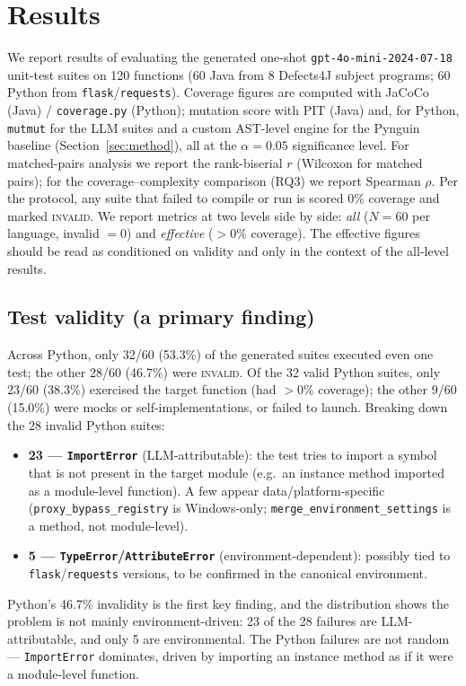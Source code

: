 \section{Results}
\label{sec:results}

We report results of evaluating the generated one-shot
\texttt{gpt-4o-mini-2024-07-18} unit-test suites on 120 functions (60 Java from 8
Defects4J subject programs; 60 Python from \texttt{flask}/\texttt{requests}). Coverage
figures are computed with JaCoCo (Java) / \texttt{coverage.py} (Python); mutation score
with PIT (Java) and, for Python, \texttt{mutmut} for the LLM suites and a custom AST-level
engine for the Pynguin baseline (Section~\ref{sec:method}), all at the $\alpha = 0.05$
significance level. For matched-pairs analysis we report the rank-biserial $r$ (Wilcoxon
for matched pairs); for the coverage--complexity comparison (RQ3) we report Spearman
$\rho$. Per the protocol, any suite that failed to compile or run is scored 0\% coverage
and marked \textsc{invalid}. We report metrics at two levels side by side: \emph{all}
($N=60$ per language, invalid $=0$) and \emph{effective} ($>0\%$ coverage). The effective
figures should be read as conditioned on validity and only in the context of the
all-level results.

\subsection{Test validity (a primary finding)}
Across Python, only 32/60 (53.3\%) of the generated suites executed even one test; the
other 28/60 (46.7\%) were \textsc{invalid}. Of the 32 valid Python suites, only 23/60
(38.3\%) exercised the target function (had $>0\%$ coverage); the other 9/60 (15.0\%) were
mocks or self-implementations, or failed to launch. Breaking down the 28 invalid Python
suites:
\begin{itemize}
  \item \textbf{23 --- \texttt{ImportError}} (LLM-attributable): the test tries to import
        a symbol that is not present in the target module (e.g.\ an instance method
        imported as a module-level function). A few appear data/platform-specific
        (\texttt{proxy\_bypass\_registry} is Windows-only; \texttt{merge\_environment\_settings}
        is a method, not module-level).
  \item \textbf{5 --- \texttt{TypeError}/\texttt{AttributeError}} (environment-dependent):
        possibly tied to \texttt{flask}/\texttt{requests} versions, to be confirmed in the
        canonical environment.
\end{itemize}
Python's 46.7\% invalidity is the first key finding, and the distribution shows the
problem is not mainly environment-driven: 23 of the 28 failures are LLM-attributable, and
only 5 are environmental. The Python failures are not random --- \texttt{ImportError}
dominates, driven by importing an instance method as if it were a module-level function.

